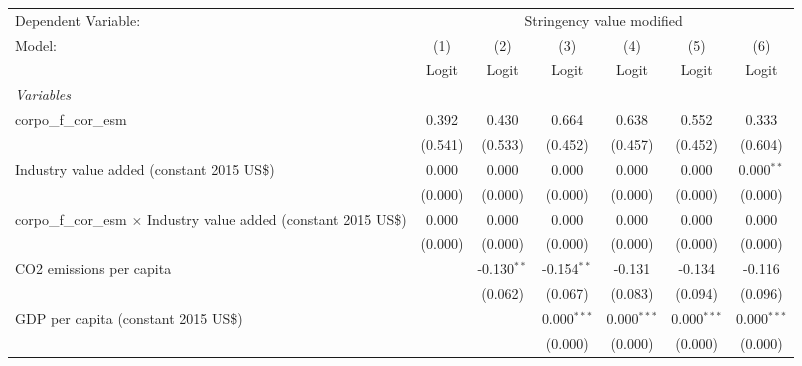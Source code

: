 
\begingroup
\centering
\begin{tabular}{lcccccc}
   \toprule
   Dependent Variable: & \multicolumn{6}{c}{Stringency value modified}\\
   Model:                                                                     & (1)     & (2)           & (3)           & (4)           & (5)           & (6)\\  
                                                                              &  Logit  & Logit         & Logit         & Logit         & Logit         & Logit\\  
   \midrule
   \emph{Variables}\\
   corpo\_f\_cor\_esm                                                         & 0.392   & 0.430         & 0.664         & 0.638         & 0.552         & 0.333\\   
                                                                              & (0.541) & (0.533)       & (0.452)       & (0.457)       & (0.452)       & (0.604)\\   
   Industry value added (constant 2015 US\$)                                  & 0.000   & 0.000         & 0.000         & 0.000         & 0.000         & 0.000$^{**}$\\   
                                                                              & (0.000) & (0.000)       & (0.000)       & (0.000)       & (0.000)       & (0.000)\\   
   corpo\_f\_cor\_esm $\times$ Industry value added (constant 2015 US\$)      & 0.000   & 0.000         & 0.000         & 0.000         & 0.000         & 0.000\\   
                                                                              & (0.000) & (0.000)       & (0.000)       & (0.000)       & (0.000)       & (0.000)\\   
   CO2 emissions per capita                                                   &         & -0.130$^{**}$ & -0.154$^{**}$ & -0.131        & -0.134        & -0.116\\   
                                                                              &         & (0.062)       & (0.067)       & (0.083)       & (0.094)       & (0.096)\\   
   GDP per capita (constant 2015 US\$)                                        &         &               & 0.000$^{***}$ & 0.000$^{***}$ & 0.000$^{***}$ & 0.000$^{***}$\\   
                                                                              &         &               & (0.000)       & (0.000)       & (0.000)       & (0.000)\\   

\end{tabular}
